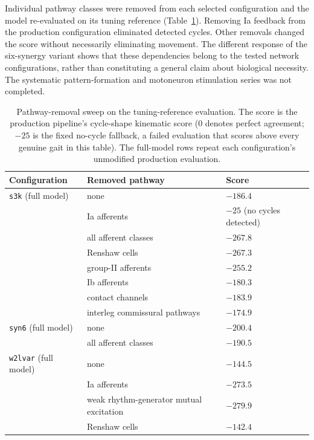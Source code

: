 Individual pathway classes were removed from each selected configuration and the model re-evaluated on its tuning reference (Table~\ref{tab:walker_ablations}). Removing Ia feedback from the production configuration eliminated detected cycles. Other removals changed the score without necessarily eliminating movement. The different response of the six-synergy variant shows that these dependencies belong to the tested network configurations, rather than constituting a general claim about biological necessity. The systematic pattern-formation and motoneuron stimulation series was not completed.

\begin{table}[htbp]
\caption{Pathway-removal sweep on the tuning-reference evaluation. The score is the production pipeline's cycle-shape kinematic score (0 denotes perfect agreement; $-25$ is the fixed no-cycle fallback, a failed evaluation that scores above every genuine gait in this table). The full-model rows repeat each configuration's unmodified production evaluation.}
\label{tab:walker_ablations}
\small\begin{tabularx}{\textwidth}{@{}>{\raggedright\arraybackslash}p{}>{\raggedright\arraybackslash}X>{\raggedright\arraybackslash}p{}@{}}
\toprule
\textbf{Configuration} & \textbf{Removed pathway} & \textbf{Score} \\
\midrule
\texttt{s3k} (full model) & none & $-186.4$ \\
 & Ia afferents & $-25$ (no cycles detected) \\
 & all afferent classes & $-267.8$ \\
 & Renshaw cells & $-267.3$ \\
 & group-II afferents & $-255.2$ \\
 & Ib afferents & $-180.3$ \\
 & contact channels & $-183.9$ \\
 & interleg commissural pathways & $-174.9$ \\
\addlinespace
\texttt{syn6} (full model) & none & $-200.4$ \\
 & all afferent classes & $-190.5$ \\
\addlinespace
\texttt{w2lvar} (full model) & none & $-144.5$ \\
 & Ia afferents & $-273.5$ \\
 & weak rhythm-generator mutual excitation & $-279.9$ \\
 & Renshaw cells & $-142.4$ \\
\bottomrule
\end{tabularx}
\end{table}

